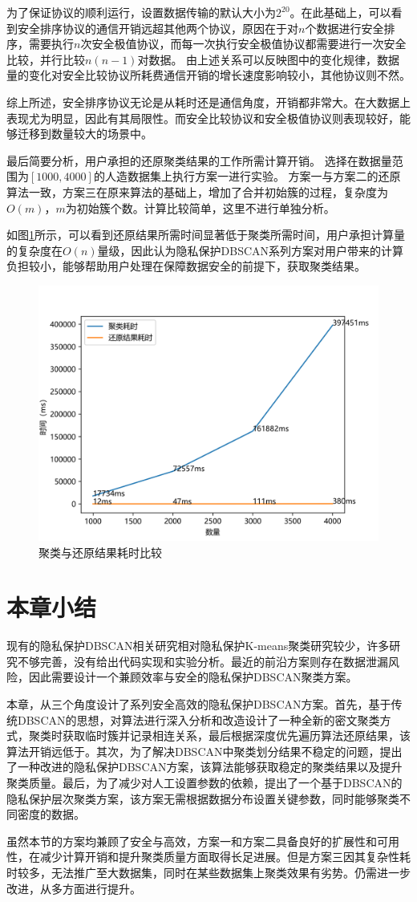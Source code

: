 为了保证协议的顺利运行，设置数据传输的默认大小为$ 2^{20} $。在此基础上，可以看到安全排序协议的通信开销远超其他两个协议，原因在于对$ n $个数据进行安全排序，需要执行$ n $次安全极值协议，而每一次执行安全极值协议都需要进行一次安全比较，并行比较$ n(n-1) $对数据。
由上述关系可以反映图中的变化规律，数据量的变化对安全比较协议所耗费通信开销的增长速度影响较小，其他协议则不然。

综上所述，安全排序协议无论是从耗时还是通信角度，开销都非常大。在大数据上表现尤为明显，因此有其局限性。而安全比较协议和安全极值协议则表现较好，能够迁移到数量较大的场景中。

最后简要分析，用户承担的还原聚类结果的工作所需计算开销。
选择在数据量范围为$ [1000,4000] $的人造数据集上执行方案一进行实验。
方案一与方案二的还原算法一致，方案三在原来算法的基础上，增加了合并初始簇的过程，复杂度为$ O(m) $，$ m $为初始簇个数。计算比较简单，这里不进行单独分析。

如图\ref{s4-exp-recover}所示，可以看到还原结果所需时间显著低于聚类所需时间，用户承担计算量的复杂度在$ O(n) $量级，因此认为隐私保护DBSCAN系列方案对用户带来的计算负担较小，能够帮助用户处理在保障数据安全的前提下，获取聚类结果。
\begin{figure}[htbp]
	\centering
	\includegraphics[width=0.6\linewidth]{img/testrc.png}
	\caption{聚类与还原结果耗时比较}
	\label{s4-exp-recover}
\end{figure}

\section{本章小结}
\label{s4-xiaojie}
现有的隐私保护DBSCAN相关研究相对隐私保护K-means聚类研究较少，许多研究不够完善，没有给出代码实现和实验分析。最近的前沿方案\cite{boz}则存在数据泄漏风险，因此需要设计一个兼顾效率与安全的隐私保护DBSCAN聚类方案。

本章，从三个角度设计了系列安全高效的隐私保护DBSCAN方案。首先，基于传统DBSCAN的思想，对算法进行深入分析和改造设计了一种全新的密文聚类方式，聚类时获取临时簇并记录相连关系，最后根据深度优先遍历算法还原结果，该算法开销远低于\cite{bozdemir2021privacy}。其次，为了解决DBSCAN中聚类划分结果不稳定的问题，提出了一种改进的隐私保护DBSCAN方案，该算法能够获取稳定的聚类结果以及提升聚类质量。最后，为了减少对人工设置参数的依赖，提出了一个基于DBSCAN的隐私保护层次聚类方案，该方案无需根据数据分布设置关键参数，同时能够聚类不同密度的数据。

虽然本节的方案均兼顾了安全与高效，方案一和方案二具备良好的扩展性和可用性，在减少计算开销和提升聚类质量方面取得长足进展。但是方案三因其复杂性耗时较多，无法推广至大数据集，同时在某些数据集上聚类效果有劣势。仍需进一步改进，从多方面进行提升。